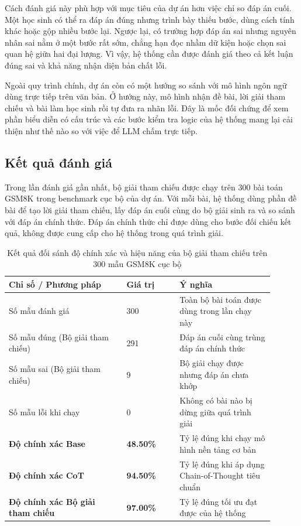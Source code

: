 \documentclass[12pt,a4paper]{article}
\begin{document}
Cách đánh giá này phù hợp với mục tiêu của dự án hơn việc chỉ so đáp án cuối.
Một học sinh có thể ra đáp án đúng nhưng trình bày thiếu bước, dùng cách tính
khác hoặc gộp nhiều bước lại. Ngược lại, có trường hợp đáp án sai nhưng nguyên
nhân sai nằm ở một bước rất sớm, chẳng hạn đọc nhầm dữ kiện hoặc chọn sai quan
hệ giữa hai đại lượng. Vì vậy, hệ thống cần được đánh giá theo cả kết luận đúng
sai và khả năng nhận diện bản chất lỗi.

Ngoài quy trình chính, dự án còn có một hướng so sánh với mô hình ngôn ngữ dùng
trực tiếp trên văn bản. Ở hướng này, mô hình nhận đề bài, lời giải tham chiếu và
bài làm học sinh rồi tự đưa ra nhãn lỗi. Đây là mốc đối chứng để xem phần biểu diễn
có cấu trúc và các bước kiểm tra logic của hệ thống mang lại cải thiện như thế
nào so với việc để LLM chấm trực tiếp.

\subsection{Kết quả đánh giá}

Trong lần đánh giá gần nhất, bộ giải tham chiếu được chạy trên 300 bài toán
GSM8K trong benchmark cục bộ của dự án. Với mỗi bài, hệ thống dùng phần đề bài
để tạo lời giải tham chiếu, lấy đáp án cuối cùng do bộ giải sinh ra và so sánh
với đáp án chính thức. Đáp án chính thức chỉ được dùng cho bước đối chiếu kết
quả, không được cung cấp cho hệ thống trong quá trình giải.

\begin{table}[H]
    \centering
    \begin{tabular}{p{0.4\linewidth} p{0.18\linewidth} p{0.32\linewidth}}
        \toprule
        \textbf{Chỉ số / Phương pháp} & \textbf{Giá trị} & \textbf{Ý nghĩa} \\
        \midrule
        Số mẫu đánh giá & 300 & Toàn bộ bài toán được dùng trong lần chạy này \\
        Số mẫu đúng (Bộ giải tham chiếu) & 291 & Đáp án cuối cùng trùng đáp án chính thức \\
        Số mẫu sai (Bộ giải tham chiếu) & 9 & Bộ giải chạy được nhưng đáp án chưa khớp \\
        Số mẫu lỗi khi chạy & 0 & Không có bài nào bị dừng giữa quá trình giải \\
        \midrule
        \textbf{Độ chính xác Base} & \textbf{48.50\%} & Tỷ lệ đúng khi chạy mô hình nền tảng cơ bản \\
        \textbf{Độ chính xác CoT} & \textbf{94.50\%} & Tỷ lệ đúng khi áp dụng Chain-of-Thought tiêu chuẩn \\
        \textbf{Độ chính xác Bộ giải tham chiếu} & \textbf{97.00\%} & Tỷ lệ đúng tối ưu đạt được của hệ thống \\
        \bottomrule
    \end{tabular}
    \caption{Kết quả đối sánh độ chính xác và hiệu năng của bộ giải tham chiếu trên 300 mẫu GSM8K cục bộ}
\end{table}
\end{document}
